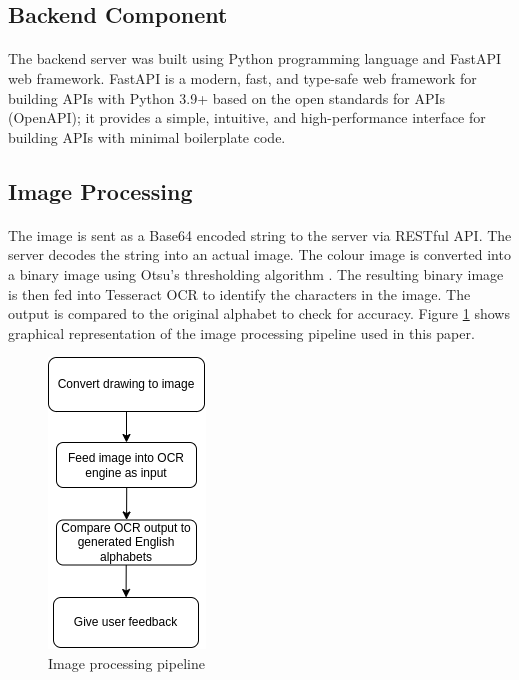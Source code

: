 \documentclass[twocolumn,oneside,12pt,a4paper]{article}
\begin{document}
\subsection{Backend Component}
\paragraph*{}
The backend server was built using Python programming language and FastAPI web framework. FastAPI is a modern, fast, and type-safe web framework for building APIs with Python 3.9+ based on the open standards for APIs (OpenAPI); it provides a simple, intuitive, and high-performance interface for building APIs with minimal boilerplate code.

\subsection{Image Processing}
\paragraph*{}
The image is sent as a Base64 encoded string to the server via RESTful API. The server decodes the string into an actual image. The colour image is converted into a binary image using Otsu’s thresholding algorithm \cite{bangare_reviewing_2015}. The resulting binary image is then fed into Tesseract OCR to identify the characters in the image. The output is compared to the original alphabet to check for accuracy. Figure \ref*{fig:image_processing_pipeline} shows graphical representation of the image processing pipeline used in this paper.

\begin{figure}
    \centering
    \includegraphics[]{../image-pipeline.png}
    \caption{Image processing pipeline}
    \label{fig:image_processing_pipeline}
\end{figure}
\end{document}

